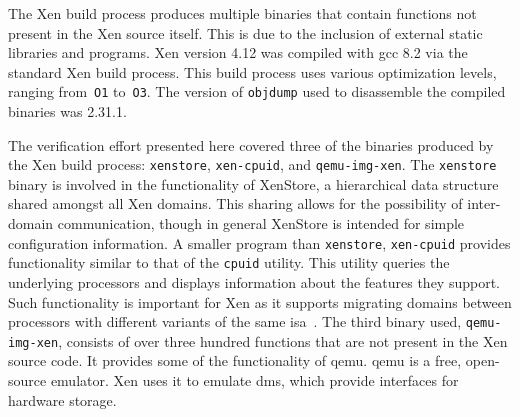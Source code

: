 The Xen build process produces multiple binaries
that contain functions not present in the Xen source itself.
This is due to the inclusion of external static libraries and programs.
Xen version 4.12 was compiled with \ac{gcc} 8.2 via the standard Xen build process.
This build process uses various optimization levels,
ranging from~\texttt{O1} to~\texttt{O3}.
The version of \texttt{objdump} used to disassemble the compiled binaries was 2.31.1.%
%

The verification effort presented here
covered three of the binaries produced by the Xen build process:
\lstinline|xenstore|, \lstinline|xen-cpuid|, and \lstinline|qemu-img-xen|.
The \lstinline|xenstore| binary is involved in the functionality of
XenStore,
a hierarchical data structure shared amongst all Xen domains.
This sharing allows for the possibility of inter-domain communication,
though in general XenStore is intended for simple configuration information.
A smaller program than \lstinline|xenstore|, \lstinline|xen-cpuid|
provides functionality similar to that of the
\lstinline|cpuid| utility.
This utility queries the underlying processors
and displays information about the features they support.
Such functionality is important for Xen
as it supports migrating domains
between processors with different variants of the same \ac{isa}~\citep{cpuid-masking}.
The third binary used, \lstinline|qemu-img-xen|,
consists of over three hundred functions
that are not present in the Xen source code.
It provides some of the functionality of \ac{qemu}.
\Ac{qemu} is a free, open-source emulator.%
Xen uses it to emulate \acp{dm}, which provide interfaces for hardware storage.


